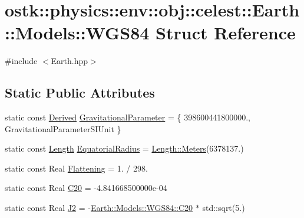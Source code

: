 \hypertarget{structostk_1_1physics_1_1env_1_1obj_1_1celest_1_1_earth_1_1_models_1_1_w_g_s84}{}\section{ostk\+:\+:physics\+:\+:env\+:\+:obj\+:\+:celest\+:\+:Earth\+:\+:Models\+:\+:W\+G\+S84 Struct Reference}
\label{structostk_1_1physics_1_1env_1_1obj_1_1celest_1_1_earth_1_1_models_1_1_w_g_s84}


{\ttfamily \#include $<$Earth.\+hpp$>$}

\subsection*{Static Public Attributes}
\begin{DoxyCompactItemize}
\item 
static const \hyperlink{classostk_1_1physics_1_1units_1_1_derived}{Derived} \hyperlink{structostk_1_1physics_1_1env_1_1obj_1_1celest_1_1_earth_1_1_models_1_1_w_g_s84_ad9da871753c1f2bbe4f4d8ad2faf11ba}{Gravitational\+Parameter} = \{ 398600441800000., Gravitational\+Parameter\+S\+I\+Unit \}
\item 
static const \hyperlink{classostk_1_1physics_1_1units_1_1_length}{Length} \hyperlink{structostk_1_1physics_1_1env_1_1obj_1_1celest_1_1_earth_1_1_models_1_1_w_g_s84_a87a056bc54308532e8148c9d9addca5d}{Equatorial\+Radius} = \hyperlink{classostk_1_1physics_1_1units_1_1_length_ad227977ce00756791595796a0dd5ddd7}{Length\+::\+Meters}(6378137.)
\item 
static const Real \hyperlink{structostk_1_1physics_1_1env_1_1obj_1_1celest_1_1_earth_1_1_models_1_1_w_g_s84_abf5d54a510bb9f9ba11cecdb60a16e17}{Flattening} = 1. / 298.
\item 
static const Real \hyperlink{structostk_1_1physics_1_1env_1_1obj_1_1celest_1_1_earth_1_1_models_1_1_w_g_s84_ae42abb8da1cf5323b3b01e604a2743ce}{C20} = -\/4.\+841668500000e-\/04
\item 
static const Real \hyperlink{structostk_1_1physics_1_1env_1_1obj_1_1celest_1_1_earth_1_1_models_1_1_w_g_s84_ac4a0736f324dc3faf5f5b279e7daac45}{J2} = -\/\hyperlink{structostk_1_1physics_1_1env_1_1obj_1_1celest_1_1_earth_1_1_models_1_1_w_g_s84_ae42abb8da1cf5323b3b01e604a2743ce}{Earth\+::\+Models\+::\+W\+G\+S84\+::\+C20} $\ast$ std\+::sqrt(5.)
\end{DoxyCompactItemize}


